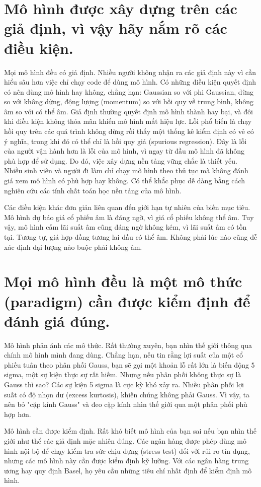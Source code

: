 \section{Mô hình được xây dựng trên các giả định, vì vậy hãy nắm rõ các điều kiện.}

Mọi mô hình đều có giả định. Nhiều người không nhận ra các giả định này vì cần hiểu sâu hơn việc chỉ chạy code để dùng mô hình. Có những điều kiện quyết định có nên dùng mô hình hay không, chẳng hạn: Gaussian so với phi Gaussian, dừng so với không dừng, động lượng (momentum) so với hồi quy về trung bình, không âm so với có thể âm. Giả định thường quyết định mô hình thành hay bại, và đôi khi điều kiện không thỏa mãn khiến mô hình mất hiệu lực. Lỗi phổ biến là chạy hồi quy trên các quá trình không dừng rồi thấy một thống kê kiểm định có vẻ có ý nghĩa, trong khi đó có thể chỉ là hồi quy giả (spurious regression). Đây là lỗi của người vận hành hơn là lỗi của mô hình, vì ngay từ đầu mô hình đã không phù hợp để sử dụng. Do đó, việc xây dựng nền tảng vững chắc là thiết yếu. Nhiều sinh viên và người đi làm chỉ chạy mô hình theo thủ tục mà không đánh giá xem mô hình có phù hợp hay không. Có thể khắc phục dễ dàng bằng cách nghiên cứu các tính chất toán học nền tảng của mô hình.

Các điều kiện khác đơn giản liên quan đến giới hạn tự nhiên của biến mục tiêu. Mô hình dự báo giá cổ phiếu âm là đáng ngờ, vì giá cổ phiếu không thể âm. Tuy vậy, mô hình cấm lãi suất âm cũng đáng ngờ không kém, vì lãi suất âm có tồn tại. Tương tự, giá hợp đồng tương lai dầu có thể âm. Không phải lúc nào cũng dễ xác định đại lượng nào buộc phải không âm.

\section{Mọi mô hình đều là một mô thức (paradigm) cần được kiểm định để đánh giá đúng.}

Mô hình phản ánh các mô thức. Rất thường xuyên, bạn nhìn thế giới thông qua chính mô hình mình đang dùng. Chẳng hạn, nếu tin rằng lợi suất của một cổ phiếu tuân theo phân phối Gauss, bạn sẽ gọi một khoản lỗ rất lớn là biến động 5 sigma, một sự kiện thực sự rất hiếm. Nhưng nếu phân phối không thực sự là Gauss thì sao? Các sự kiện 5 sigma là cực kỳ khó xảy ra. Nhiều phân phối lợi suất có độ nhọn dư (excess kurtosis), khiến chúng không phải Gauss. Vì vậy, ta nên bỏ "cặp kính Gauss" và đeo cặp kính nhìn thế giới qua một phân phối phù hợp hơn.

Mô hình cần được kiểm định. Rất khó biết mô hình của bạn sai nếu bạn nhìn thế giới như thể các giả định mặc nhiên đúng. Các ngân hàng được phép dùng mô hình nội bộ để chạy kiểm tra sức chịu đựng (stress test) đối với rủi ro tín dụng, nhưng các mô hình này cần được kiểm định kỹ lưỡng. Với các ngân hàng trung ương hay quy định Basel, họ yêu cầu những tiêu chí nhất định để kiểm định mô hình.

